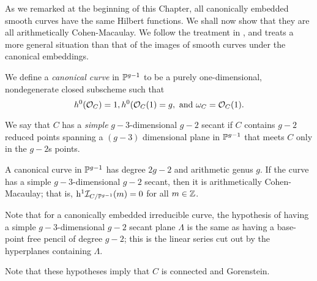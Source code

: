 As we remarked at the beginning of this Chapter, all canonically embedded smooth curves have the same Hilbert functions. We shall now show that they are all arithmetically Cohen-Macaulay.
We follow the treatment in \cite{Schreyer}, and treats a more general situation than that of the 
images of smooth curves under the canonical embeddings.

We define a \emph{canonical curve} in $\PP^{g-1}$ to be a purely one-dimensional, nondegenerate closed subscheme  such that
$$
 h^{0}(\sO_{C}) = 1, h^{0}(\sO_{C}(1) = g, \hbox{ and } \omega_{C} = \sO_{C}(1).
$$

We say that $C$ has a \emph{simple} $g-3$-dimensional $g-2$ secant if $C$ contains $g-2$ reduced points spanning a $(g-3)$ dimensional
plane in $\PP^{g-1}$ that meets $C$ only in the $g-2$s points.

\begin{theorem}
A canonical curve in $\PP^{g-1}$ has degree $2g-2$ and arithmetic genus $g$. If the curve has a simple
$g-3$-dimensional $g-2$ secant, then it is arithmetically Cohen-Macaulay; that is,
$\h^{1}\sI_{C/\PP^{g-1}}(m) = 0$ for all $m\in \ZZ$.
\end{theorem}
 
Note that for a canonically embedded irreducible curve, the hypothesis of having a simple $g-3$-dimensional $g-2$ secant plane $\Lambda$ is the same as having a base-point free pencil of degree $g-2$; this is the linear series 
cut out by the hyperplanes containing $\Lambda$.

 Note that these hypotheses imply that $C$ is connected and Gorenstein.
 
